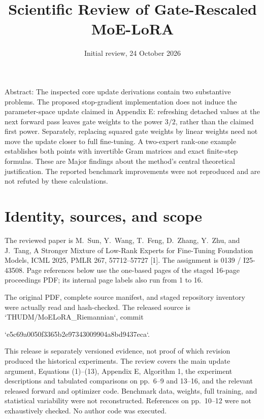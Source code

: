 \documentclass[10pt]{article}
\title{Scientific Review of Gate-Rescaled MoE-LoRA}
\author{}
\date{Initial review, 24 October 2026}
\begin{document}
\maketitle
Abstract: The inspected core update derivations contain two substantive problems. The proposed stop-gradient implementation does not induce the parameter-space update claimed in Appendix E: refreshing detached values at the next forward pass leaves gate weights to the power \(3/2\), rather than the claimed first power. Separately, replacing squared gate weights by linear weights need not move the update closer to full fine-tuning. A two-expert rank-one example establishes both points with invertible Gram matrices and exact finite-step formulas. These are Major findings about the method’s central theoretical justification. The reported benchmark improvements were not reproduced and are not refuted by these calculations.\par
\section*{Identity, sources, and scope}
The reviewed paper is M. Sun, Y. Wang, T. Feng, D. Zhang, Y. Zhu, and J. Tang, A Stronger Mixture of Low-Rank Experts for Fine-Tuning Foundation Models, ICML 2025, PMLR 267, 57712–57727 [1]. The assignment is 0139 / I25-43508. Page references below use the one-based pages of the staged 16-page proceedings PDF; its internal page labels also run from 1 to 16.\par
The original PDF, complete source manifest, and staged repository inventory were actually read and hash-checked. The released source is `THUDM/MoELoRA\_Riemannian`, commit\par
`e5c69a0050f3365b2e97343009904a8bd9437eca`.\par
This release is separately versioned evidence, not proof of which revision produced the historical experiments. The review covers the main update argument, Equations (1)–(13), Appendix E, Algorithm 1, the experiment descriptions and tabulated comparisons on pp. 6–9 and 13–16, and the relevant released forward and optimizer code. Benchmark data, weights, full training, and statistical variability were not reconstructed. References on pp. 10–12 were not exhaustively checked. No author code was executed.\par
\end{document}
